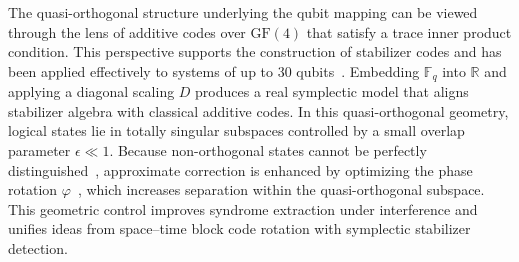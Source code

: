 \documentclass{iopjournal}
\theoremstyle{thmstyleone}%
\theoremstyle{thmstyletwo}%
\theoremstyle{thmstylethree}%
\begin{document}
The quasi-orthogonal structure underlying the qubit mapping can be viewed through the lens of additive codes over $\mathrm{GF}(4)$ that satisfy a trace inner product condition. This perspective supports the construction of stabilizer codes and has been applied  effectively  to systems of up to 30 qubits~\cite{Calderbank1998quantum}.
Embedding $\mathbb{F}_q$ into $\mathbb{R}$ and applying a diagonal scaling $D$ produces a real symplectic model that aligns stabilizer algebra with classical additive codes. In this quasi-orthogonal geometry, logical states lie in totally singular subspaces controlled by a small overlap parameter $\epsilon \ll 1$. Because non-orthogonal states cannot be perfectly distinguished~\cite{Barnett2009quantum}, approximate correction is enhanced by optimizing the phase rotation $\varphi$~\cite{Sharma2002improve}, which increases separation within the quasi-orthogonal subspace. This geometric control improves syndrome extraction under interference and unifies ideas from space–time block code rotation with symplectic stabilizer detection.

\medskip
\end{document}
